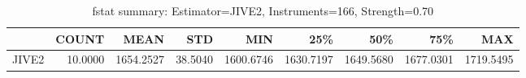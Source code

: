 \begin{table}[ht]
\centering
\caption{fstat summary: Estimator=JIVE2, Instruments=166, Strength=0.70}
\begin{tabular}{lrrrrrrrr}
\toprule
 & COUNT & MEAN & STD & MIN & 25\% & 50\% & 75\% & MAX \\
\midrule
JIVE2 & 10.0000 & 1654.2527 & 38.5040 & 1600.6746 & 1630.7197 & 1649.5680 & 1677.0301 & 1719.5495 \\
\bottomrule
\end{tabular}
\end{table}
